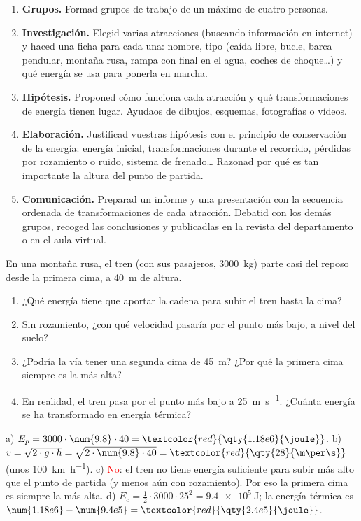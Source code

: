 \begin{enumerate}[label=\numberballred]
    \item \textbf{Grupos.} Formad grupos de trabajo de un máximo de cuatro personas.
    \item \textbf{Investigación.} Elegid varias atracciones (buscando información en internet) y haced una ficha para cada una: nombre, tipo (caída libre, bucle, barca pendular, montaña rusa, rampa con final en el agua, coches de choque\ldots) y qué energía se usa para ponerla en marcha.
    \item \textbf{Hipótesis.} Proponed cómo funciona cada atracción y qué transformaciones de energía tienen lugar. Ayudaos de dibujos, esquemas, fotografías o vídeos.
    \item \textbf{Elaboración.} Justificad vuestras hipótesis con el principio de conservación de la energía: energía inicial, transformaciones durante el recorrido, pérdidas por rozamiento o ruido, sistema de frenado\ldots{} Razonad por qué es tan importante la altura del punto de partida.
    \item \textbf{Comunicación.} Preparad un informe y una presentación con la secuencia ordenada de transformaciones de cada atracción. Debatid con los demás grupos, recoged las conclusiones y publicadlas en la revista del departamento o en el aula virtual.
\end{enumerate}

\begin{exercise}
    En una montaña rusa, el tren (con sus pasajeros, \qty{3000}{\kg}) parte casi del reposo desde la primera cima, a \qty{40}{\m} de altura.
    \begin{enumerate}[label=\alph*)]
        \item ¿Qué energía tiene que aportar la cadena para subir el tren hasta la cima?
        \item Sin rozamiento, ¿con qué velocidad pasaría por el punto más bajo, a nivel del suelo?
        \item ¿Podría la vía tener una segunda cima de \qty{45}{\m}? ¿Por qué la primera cima siempre es la más alta?
        \item En realidad, el tren pasa por el punto más bajo a \qty{25}{\m\per\s}. ¿Cuánta energía se ha transformado en energía térmica?
    \end{enumerate}
    \begin{solu}
        a) \(E_p = 3000 \cdot \num{9.8} \cdot 40 = \textcolor{red}{\qty{1.18e6}{\joule}}\).
        b) \(v = \sqrt{2 \cdot g \cdot h} = \sqrt{2 \cdot \num{9.8} \cdot 40} = \textcolor{red}{\qty{28}{\m\per\s}}\) (unos \qty{100}{\km\per\hour}).
        c) \textcolor{red}{No}: el tren no tiene energía suficiente para subir más alto que el punto de partida (y menos aún con rozamiento). Por eso la primera cima es siempre la más alta.
        d) \(E_c = \frac{1}{2} \cdot 3000 \cdot 25^2 = \qty{9.4e5}{\joule}\); la energía térmica es \(\num{1.18e6} - \num{9.4e5} = \textcolor{red}{\qty{2.4e5}{\joule}}\).
    \end{solu}
\end{exercise}

